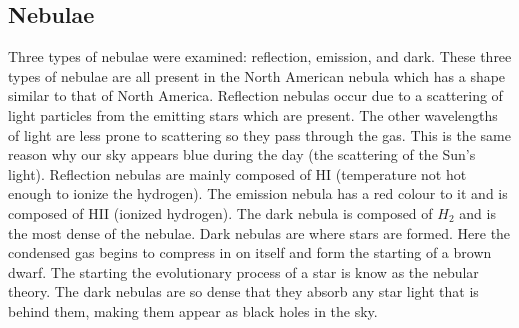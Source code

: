 \documentclass{article}
\begin{document}
\subsection{Nebulae}
Three types of nebulae were examined: reflection, emission, and dark. These three types of
nebulae are all present in the North American nebula which has a shape similar to that of
North America. Reflection nebulas occur due to a scattering of light particles from the
emitting stars which are present. The other wavelengths of light are less prone to
scattering so they pass through the gas. This is the same reason why our sky appears
blue during the day (the scattering of the Sun's light). Reflection nebulas are mainly
composed of HI (temperature not hot enough to ionize the hydrogen). 
The emission nebula has a red colour to it and is composed of HII (ionized hydrogen).
The dark nebula is composed of $H_{2}$ and is the most dense of the nebulae. Dark nebulas
are where stars are formed. Here the condensed gas begins to compress in on itself and
form the starting of a brown dwarf. The starting the evolutionary process of a star is
know as the nebular theory. The dark nebulas are so dense that they absorb any star
light that is behind them, making them appear as black holes in the sky.
\end{document}
